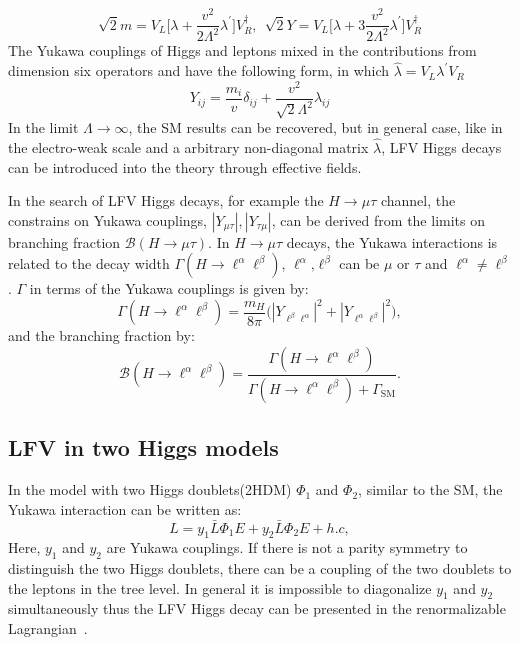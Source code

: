 \begin{equation}
\sqrt{2}m=V_{L}\Big[\lambda+\frac{v^{2}}{2\Lambda^{2}}\lambda^{'}\Big]V^{\dagger}_{R},~~\sqrt{2}Y=V_{L}\Big[\lambda+3\frac{v^{2}}{2\Lambda^{2}}\lambda^{'}\Big]V^{\dagger}_{R}
\end{equation}
The Yukawa couplings of Higgs and leptons mixed in the contributions from dimension six operators and have the following form, in which $\hat{\lambda}=V_{L}\lambda^{'}V_{R}$
\begin{equation}
Y_{ij}=\frac{m_{i}}{v}\delta_{ij}+\frac{v^{2}}{\sqrt{2}\Lambda^{2}}\hat{\lambda}_{ij}
\end{equation}
In the limit $\Lambda \to \infty$, the SM results can be recovered, but in general case, like in the electro-weak scale and a arbitrary non-diagonal matrix $\hat{\lambda}$, LFV Higgs decays can be introduced into the theory through effective fields.

In the search of LFV Higgs decays, for example the $H\to \mu\tau$ channel, the constrains on Yukawa couplings, $|Y_{\mu\tau}|, |Y_{\tau\mu}|$, can be derived from the limits on branching fraction $\mathcal{B}(H \to \mu \tau)$. In $H \to \mu \tau$ decays, the Yukawa interactions is related to the decay width  $\Gamma(H \to \ell^{\alpha}\ell^{\beta})$,  $\ell^{\alpha}\textrm{,}\ell^{\beta}$ can be $\mu$ or $\tau$ and $\ell^{\alpha} \neq \ell^{\beta}$. $\Gamma$ in terms of the Yukawa couplings is given by:
\begin{equation}  
\Gamma(H \to \ell^{\alpha}\ell^{\beta})=\frac{m_{H}}{8\pi}\bigl(|Y_{\ell^{\beta}\ell^{\alpha}}|^2 + |Y_{\ell^{\alpha}\ell^{\beta}}|^2\bigr),\label{eq:Yukawa}
\end{equation}
and the branching fraction by:
\begin{equation}
\mathcal{B}(H \to \ell^{\alpha}\ell^{\beta})=\frac{\Gamma(H\to \ell^{\alpha}\ell^{\beta})}{\Gamma(H\to \ell^{\alpha}\ell^{\beta}) + \Gamma_{\mathrm{SM}}}. \label{eq:Branchingfraction}
\end{equation}



\subsection{LFV in two Higgs models}

In the model with two Higgs doublets(2HDM) $\Phi_{1}$ and $\Phi_{2}$, similar to the SM, the Yukawa interaction can be written as: 
\begin{equation}
L=y_{1}\bar{L}\Phi_{1}E+y_{2}\bar{L}\Phi_{2}E+h.c,
\end{equation}
Here, $y_{1}$ and $y_{2}$ are Yukawa couplings. If there is not a parity symmetry to distinguish the two Higgs doublets, there can be a coupling of the two doublets to the leptons in the tree level. In general it is impossible to diagonalize $y_{1}$ and $y_{2}$ simultaneously thus the LFV Higgs decay can be presented in the renormalizable Lagrangian~\cite{deLima2015}.%


